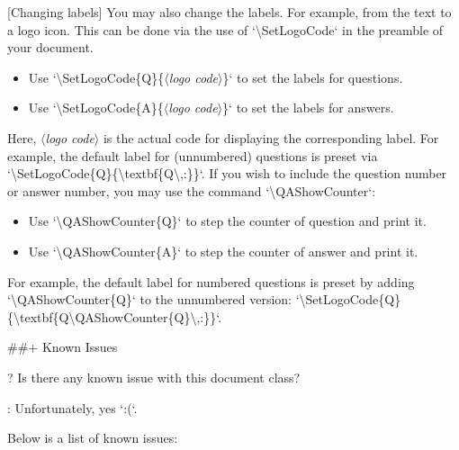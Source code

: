 \documentclass[%
  use style = classical,
  scroll,
]{Q-and-A}
\newcommand{\meta}[1]{$\langle${\normalfont\itshape#1}$\rangle$}
\begin{document}
  [Changing labels]
  You may also change the labels. For example, from the text  to a logo icon. This can be done via the use of `\textbackslash SetLogoCode` in the preamble of your document.
  \begin{itemize}
    \item Use `\textbackslash SetLogoCode\{Q\}\{\meta{logo code}\}` to set the labels for questions.
    \item Use `\textbackslash SetLogoCode\{A\}\{\meta{logo code}\}` to set the labels for answers.
  \end{itemize}
  Here, \meta{logo code} is the actual code for displaying the corresponding label. For example, the default label for (unnumbered) questions is preset via `\textbackslash SetLogoCode\{Q\}\{\textbackslash textbf\{Q\textbackslash,:\}\}`.
  If you wish to include the question number or answer number, you may use the command `\textbackslash QAShowCounter`:
  \begin{itemize}
    \item Use `\textbackslash QAShowCounter\{Q\}` to step the counter of question and print it.
    \item Use `\textbackslash QAShowCounter\{A\}`  to step the counter of answer and print it.
  \end{itemize}
  For example, the default label for numbered questions is preset by adding `\textbackslash QAShowCounter\{Q\}` to the unnumbered version: `\textbackslash SetLogoCode\{Q\}\{\textbackslash textbf\{Q\textbackslash QAShowCounter\{Q\}\textbackslash,:\}\}`.


##+ {Known Issues}

?
  Is there any known issue with this document class?

:
  Unfortunately, yes `:(`.

  Below is a list of known issues:
\end{document}
